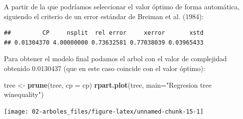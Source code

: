 \documentclass[]{book}
\newenvironment{Shaded}{\begin{snugshade}}{\end{snugshade}}
\newcommand{\KeywordTok}[1]{\textcolor[rgb]{0.13,0.29,0.53}{\textbf{#1}}}
\newcommand{\DataTypeTok}[1]{\textcolor[rgb]{0.13,0.29,0.53}{#1}}
\newcommand{\StringTok}[1]{\textcolor[rgb]{0.31,0.60,0.02}{#1}}
\newcommand{\CommentTok}[1]{\textcolor[rgb]{0.56,0.35,0.01}{\textit{#1}}}
\newcommand{\OperatorTok}[1]{\textcolor[rgb]{0.81,0.36,0.00}{\textbf{#1}}}
\newcommand{\NormalTok}[1]{#1}
\theoremstyle{break}
\theoremstyle{definition}
\theoremstyle{definition}
\theoremstyle{definition}
\theoremstyle{remark}
\begin{document}
A partir de la que podríamos seleccionar el valor óptimo de forma
automática, siguiendo el criterio de un error estándar de Breiman et al.
(1984):

\begin{Shaded}
\end{Shaded}

\begin{verbatim}
##         CP     nsplit  rel error     xerror       xstd 
## 0.01304370 4.00000000 0.73632581 0.77038039 0.03965433
\end{verbatim}

\begin{Shaded}
\end{Shaded}

Para obtener el modelo final podamos el arbol con el valor de
complejidad obtenido 0.0130437 (que en este caso coincide con el valor
óptimo):

\begin{Shaded}
\begin{Highlighting}[]
\NormalTok{tree <-}\StringTok{ }\KeywordTok{prune}\NormalTok{(tree, }\DataTypeTok{cp =}\NormalTok{ cp)}
\KeywordTok{rpart.plot}\NormalTok{(tree, }\DataTypeTok{main=}\StringTok{"Regresion tree winequality"}\NormalTok{) }
\end{Highlighting}
\end{Shaded}

\begin{center}\texttt{[image: 02-arboles\_files/figure-latex/unnamed-chunk-15-1]} \end{center}
\end{document}
